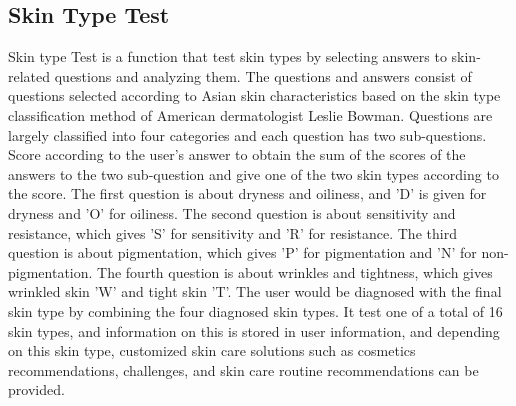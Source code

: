 \documentclass[conference]{IEEEtran}
\begin{document}
\subsection{Skin Type Test}
Skin type Test is a function that test skin types by selecting answers to skin-related questions and analyzing them. The questions and answers consist of questions selected according to Asian skin characteristics based on the skin type classification method of American dermatologist Leslie Bowman. Questions are largely classified into four categories and each question has two sub-questions. Score according to the user's answer to obtain the sum of the scores of the answers to the two sub-question and give one of the two skin types according to the score. The first question is about dryness and oiliness, and 'D' is given for dryness and 'O' for oiliness. The second question is about sensitivity and resistance, which gives 'S' for sensitivity and 'R' for resistance. The third question is about pigmentation, which gives 'P' for pigmentation and 'N' for non-pigmentation. The fourth question is about wrinkles and tightness, which gives wrinkled skin 'W' and tight skin 'T'. The user would be diagnosed with the final skin type by combining the four diagnosed skin types. It test one of a total of 16 skin types, and information on this is stored in user information, and depending on this skin type, customized skin care solutions such as cosmetics recommendations, challenges, and skin care routine recommendations can be provided. \\ \\
\end{document}
